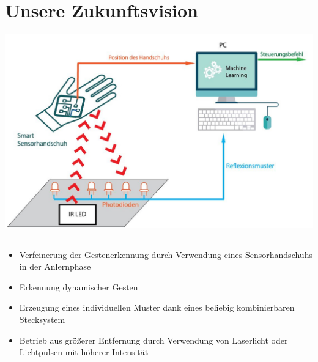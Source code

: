 \documentclass[a4paper,12pt,notumble]{leaflet}
\begin{document}
\noindent
\begin{minipage}[c][0.45\textheight][t]{\textwidth}
	
	\section{Unsere Zukunftsvision}
	
	\centering
	\includegraphics[scale=0.25]{../figures/AblaufGestikulaser3.jpg}
	
\end{minipage}

\textcolor{rwth-lblue}{\noindent\rule{\textwidth}{4pt}}

\noindent
\begin{minipage}[c][0.45\textheight][t]{\textwidth}
	\begin{itemize}
		\item Verfeinerung der Gestenerkennung durch Verwendung eines Sensorhandschuhs in der Anlernphase
		\item Erkennung dynamischer Gesten
		\item Erzeugung eines individuellen Muster dank eines beliebig kombinierbaren Stecksystem
		\item Betrieb aus größerer Entfernung durch Verwendung von Laserlicht oder Lichtpulsen mit höherer Intensität
	\end{itemize}
\end{minipage}

\newpage


\end{document}
